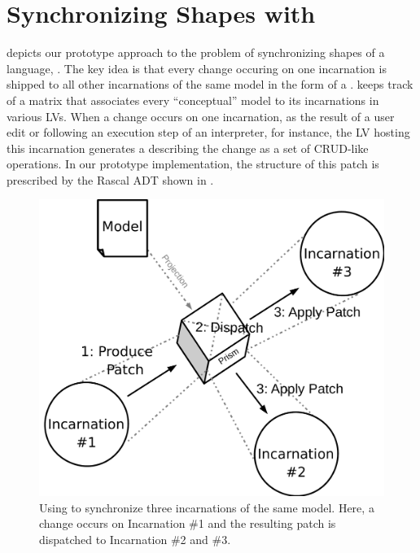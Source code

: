\section{Synchronizing Shapes with \prism}
\label{sec:prism}


 depicts our prototype approach to the problem of synchronizing shapes of a language, \prism.
The key idea is that every change occuring on one incarnation is shipped to all other incarnations of the same model in the form of a \patch.
\prism keeps track of a matrix that associates every ``conceptual'' model to its incarnations in various LVs.
When a change occurs on one incarnation, as the result of a user edit or following an execution step of an interpreter, for instance, the LV hosting this incarnation generates a \patch describing the change as a set of CRUD-like operations.
In our prototype implementation, the structure of this patch is prescribed by the Rascal ADT shown in .


\begin{figure}[bt]
	\centering
	\includegraphics[width=.6\columnwidth]{figures/prism}
	\caption{Using \prism to synchronize three incarnations of the same model. Here, a change occurs on Incarnation \#1 and the resulting patch is dispatched to Incarnation \#2 and \#3.}
	\label{fig:prism}
\end{figure}

